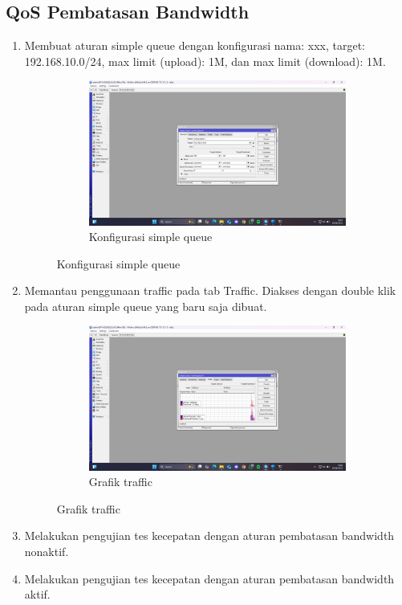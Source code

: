 \subsection{QoS Pembatasan Bandwidth}
\begin{enumerate}
	\item Membuat aturan simple queue dengan konfigurasi nama: xxx, target: 192.168.10.0/24, max limit (upload): 1M, dan max limit (download): 1M.
	\begin{figure}[H]
		\centering
		\begin{subfigure}[b]{0.4\linewidth}
			\includegraphics[width=\linewidth]{P5/img/simple q.png}
			\caption{Konfigurasi simple queue\label{fig:konfigurasiR1}}
		\end{subfigure}
	\end{figure}
	\item Memantau penggunaan traffic pada tab Traffic. Diakses dengan double klik pada aturan simple queue yang baru saja dibuat.
	\begin{figure}[H]
		\centering
		\begin{subfigure}[b]{0.4\linewidth}
			\includegraphics[width=\linewidth]{P5/img/traffic.png}
			\caption{Grafik traffic\label{fig:konfigurasiR1}}
		\end{subfigure}
	\end{figure}
	\item Melakukan pengujian tes kecepatan dengan aturan pembatasan bandwidth nonaktif.
	\item Melakukan pengujian tes kecepatan dengan aturan pembatasan bandwidth aktif.
\end{enumerate}

